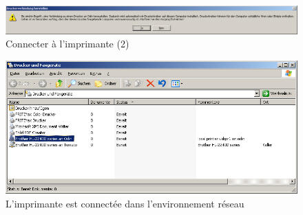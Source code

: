 \begin{figure}[hbt!]
\centering
\includegraphics[width=\columnwidth]{image021}
\caption{Connecter à l'imprimante (2)}
\label{fig:sambalpd:connect:2}
\end{figure}

\begin{figure}[hbt!]
\centering
\includegraphics[width=\columnwidth]{image022}
\caption{L'imprimante est connectée dans l'environnement réseau}
\label{fig:sambalpd:printer-environment}
\end{figure}
